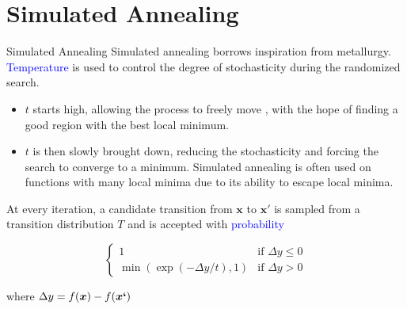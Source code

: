 \documentclass{beamer}
\begin{document}
\section{Simulated Annealing}
\begin{frame}{Simulated Annealing}
Simulated annealing borrows inspiration from metallurgy. 
\textcolor{blue}{Temperature} is used to control the degree of stochasticity during the randomized search.
\begin{itemize}
    \item $t$ starts high, allowing the process to freely move , with the hope of finding a good region with the best local minimum. 

    \item $t$ is then slowly brought down, reducing the stochasticity and forcing the search to converge to a minimum. Simulated annealing is often used on functions with many local minima due to its ability to escape local minima.
    
\end{itemize}


At every iteration, a candidate transition from $\boldsymbol{x}$ to $\boldsymbol{x}′$ is sampled from a transition distribution $T$ and is accepted with \textcolor{blue}{probability}

\begin{equation*}
\begin{cases}
1 & \textrm{if } \Delta y \leq 0\\
\min(\exp(-\Delta y/t), 1) & \textrm{if }\Delta y >0
\end{cases}
\end{equation*}

where $\Delta y = f(\boldsymbol{x})- f(\boldsymbol{x`})$

\end{frame}
\end{document}
